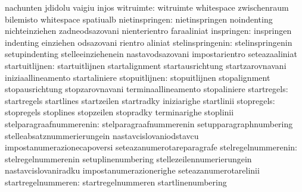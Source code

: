                                   nachunten                        jdidolu
                                  vaigiu                           injos
                       witruimte: witruimte                        whitespace
                                  zwischenraum                     bilemisto
                                  whitespace                       spatiualb
                  nietinspringen: nietinspringen                   noindenting
                                  nichteinziehen                   zadneodsazovani
                                  nienterientro                    faraaliniat
                      inspringen: inspringen                       indenting
                                  einziehen                        odsazovani
                                  rientro                          aliniat
                stelinspringenin: stelinspringenin                 setupindenting
                                  stelleeinziehenein               nastavodsazovani
                                  impostarientro                   seteazaaliniat
                  startuitlijnen: startuitlijnen                   startalignment
                                  startausrichtung                 startzarovnavani
                                  iniziaallineamento               startaliniere
                   stopuitlijnen: stopuitlijnen                    stopalignment
                                  stopausrichtung                  stopzarovnavani
                                  terminaallineamento              stopaliniere
                     startregels: startregels                      startlines
                                  startzeilen                      startradky
                                  iniziarighe                      startlinii
                      stopregels: stopregels                       stoplines
                                  stopzeilen                       stopradky
                                  terminarighe                     stoplinii
         stelparagraafnummerenin: stelparagraafnummerenin          setupparagraphnumbering
                                  stelleabsatznummerierungein      nastavcislovaniodstavcu
                                  impostanumerazionecapoversi      seteazanumerotareparagrafe
             stelregelnummerenin: stelregelnummerenin              setuplinenumbering
                                  stellezeilennumerierungein       nastavcislovaniradku
                                  impostanumerazionerighe          seteazanumerotarelinii
              startregelnummeren: startregelnummeren               startlinenumbering
